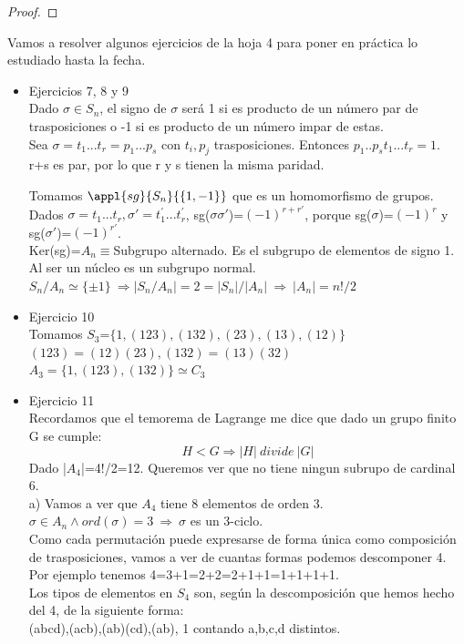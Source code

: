 \documentclass[nochap]{apuntes}
\begin{document}
\begin{proof}
\end{proof}

Vamos a resolver algunos ejercicios de la hoja 4 para poner en práctica lo estudiado hasta la fecha.
\begin{itemize}
 \item Ejercicios 7, 8 y 9\\
 Dado $\sigma \in S_n$, el signo de $\sigma$  será 1 si es producto de un número par de trasposiciones o -1 si es producto de un número
 impar de estas.\\
 Sea $\sigma = t_1...t_r=p_1...p_s$  con $t_i, p_j$  trasposiciones. Entonces $p_1..p_s t_1...t_r=1$.\\
 r+s es par, por lo que r y s tienen la misma paridad.
 
 Tomamos $\appl{sg}{S_n}{\{1,-1\}}$  que es un homomorfismo de grupos.\\
 Dados $\sigma=t_1...t_r,  \sigma'=t_1^{'}...t_r^{'}$, sg($\sigma \sigma'$)=$(-1)^{r+r'}$, porque sg($\sigma$)=$(-1)^r$  y sg($\sigma'$)=$(-1)^{r'}$.\\
 Ker(sg)=$A_n \equiv$Subgrupo alternado. Es el subgrupo de elementos de signo 1. Al ser un núcleo es un subgrupo normal.\\
 $S_n/A_n\simeq \{\pm 1\} \ \Rightarrow |S_n/A_n|=2=|S_n|/|A_n| \ \Rightarrow \ |A_n|=n!/2$\\
 
 \item Ejercicio 10\\
 Tomamos $S_3$=$\{1, (123), (132), (23), (13), (12)\}$\\
 $(123)=(12)(23), (132)=(13)(32)$\\
 $A_3=\{1, (123), (132)\} \simeq C_3$
 
 \item Ejercicio 11\\
 Recordamos que el temorema de Lagrange me dice que dado un grupo finito G se cumple:
 \[H<G \Rightarrow |H| \ divide\ |G|\]
 Dado |$A_4$|=4!/2=12. Queremos ver que no tiene ningun subrupo de cardinal 6.\\
 
 a) Vamos a ver que $A_4$  tiene 8 elementos de orden 3.\\
 $\sigma\in A_n \wedge ord(\sigma)=3 \ \Rightarrow \ \sigma$  es un 3-ciclo.\\
 Como cada permutación puede expresarse de forma única como composición de trasposiciones, vamos a ver de cuantas formas podemos 
 descomponer 4. Por ejemplo tenemos 4=3+1=2+2=2+1+1=1+1+1+1.\\
 Los tipos de elementos en $S_4$  son, según la descomposición que hemos hecho del 4, de la siguiente forma:\\
 (abcd),(acb),(ab)(cd),(ab), 1 contando a,b,c,d distintos.\\
 

\end{itemize}
\end{document}
